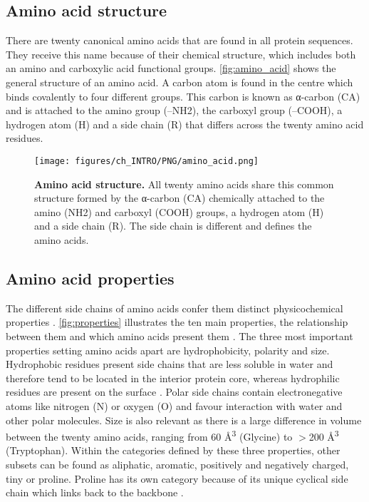 
\subsection{Amino acid structure}

There are twenty canonical amino acids that are found in all protein sequences. They receive this name because of their chemical structure, which includes both an amino and carboxylic acid functional groups. \autoref{fig:amino_acid} shows the general structure of an amino acid. A carbon atom is found in the centre which binds covalently to four different groups. This carbon is known as α-carbon (CA) and is attached to the amino group (--NH2), the carboxyl group (--COOH), a hydrogen atom (H) and a side chain (R) that differs across the twenty amino acid residues.

\begin{figure}[htbp!]
    \centering
    \texttt{[image: figures/ch\_INTRO/PNG/amino\_acid.png]}
    \caption[Amino acid structure]{\textbf{Amino acid structure.} All twenty amino acids share this common structure formed by the α-carbon (CA) chemically attached to the amino (NH2) and carboxyl (COOH) groups, a hydrogen atom (H) and a side chain (R). The side chain is different and defines the amino acids.}
    \label{fig:amino_acid}
\end{figure}


\subsection{Amino acid properties}

The different side chains of amino acids confer them distinct physicochemical properties \cite{SNEATH_1966_PROPERTIES}. \autoref{fig:properties} illustrates the ten main properties, the relationship between them and which amino acids present them \cite{TAYLOR_1986_PROPERTIES}. The three most important properties setting amino acids apart are hydrophobicity, polarity and size. Hydrophobic residues present side chains that are less soluble in water and therefore tend to be located in the interior protein core, whereas hydrophilic residues are present on the surface \cite{CHOTHIA_1976_BURIEDNESS}. Polar side chains contain electronegative atoms like nitrogen (N) or oxygen (O) and favour interaction with water and other polar molecules. Size is also relevant as there is a large difference in volume between the twenty amino acids, ranging from 60 \AA{}\textsuperscript{3} (Glycine) to $>$200 \AA{}\textsuperscript{3} (Tryptophan). Within the categories defined by these three properties, other subsets can be found as aliphatic, aromatic, positively and negatively charged, tiny or proline. Proline has its own category because of its unique cyclical side chain which links back to the backbone \cite{ZVELEBIL_1987_PREDICTION}.


